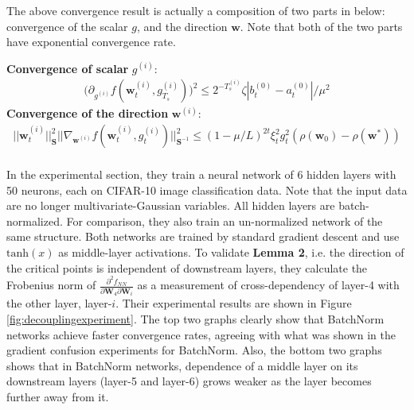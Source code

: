 \documentclass{article}
\begin{document}
The above convergence result is actually a composition of two parts in below: convergence of the scalar $g$, and the direction $\textbf{w}$. Note that both of the two parts have exponential convergence rate.

\textbf{Convergence of scalar} $g^{(i)}$:
\begin{align*}
    \Big(\partial_{g^{(i)}}f(\textbf{w}_t^{(i)},g^{(i)}_{T_s})\Big)^2\leq2^{-T_s^{(i)}}\zeta|b_t^{(0)}-a_t^{(0)}|/\mu^2
\end{align*}
\textbf{Convergence of the direction} $\textbf{w}^{(i)}$:
\begin{align*}
    ||\textbf{w}_t^{(i)}||^2_{\textbf{S}}||\nabla_{\textbf{w}^{(i)}}f(\textbf{w}_t^{(i)},g_t^{(i)})||^2_{\textbf{S}^{-1}}\leq (1-\mu/L)^{2t}\xi_t^{2}g_t^{2}(\rho(\textbf{w}_0)-\rho(\textbf{w}^*))\\
\end{align*}

\textbf{}

In the experimental section, they train a neural network of 6 hidden layers with 50 neurons, each on CIFAR-10 image classification data. Note that the input data are no longer multivariate-Gaussian variables. All hidden layers are batch-normalized. For comparison, they also train an un-normalized network of the same structure. Both networks are trained by standard gradient descent and use $\text{tanh}(x)$ as middle-layer activations. To validate \textbf{Lemma 2}, i.e. the direction of the critical points is independent of downstream layers, they calculate the Frobenius norm of $\frac{\partial^2f_{NN}}{\partial\textbf{W}_4\partial\textbf{W}_i}$ as a measurement of cross-dependency of layer-4 with the other layer, layer-$i$. Their experimental results are shown in Figure \ref{fig:decouplingexperiment}. The top two graphs clearly show that BatchNorm networks achieve faster convergence rates, agreeing with what was shown in the gradient confusion experiments for BatchNorm. Also, the bottom two graphs shows that in BatchNorm networks, dependence of a middle layer on its downstream layers (layer-5 and layer-6) grows weaker as the layer becomes further away from it.
\end{document}
